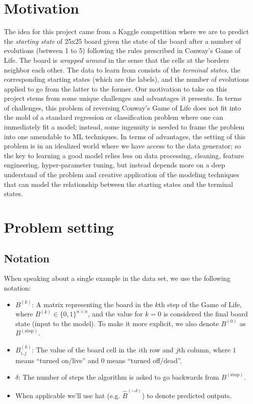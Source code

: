 \documentclass[conference]{IEEEtran}
\begin{document}
\section{Motivation}
The idea for this project came from a Kaggle competition \cite{b1} where we are to predict the {\it starting state} of 25x25 board given the state of the board after a number of evolutions (between 1 to 5) following the rules prescribed in Conway's Game of Life. The board is \emph{wrapped around} in the sense that the cells at the borders neighbor each other. The data to learn from consists of the {\it terminal states}, the corresponding starting states (which are the labels), and the number of evolutions applied to go from the latter to the former. Our motivation to take on this project stems from some unique challenges and advantages it presents. In terms of challenges, this problem of reversing Conway's Game of Life does not fit into the mold of a standard regression or classification problem where one can immediately fit a model; instead, some ingenuity is needed to frame the problem into one amendable to ML techniques. In terms of advantages, the setting of this problem is in an idealized world where we have access to the data generator; so the key to learning a good model relies less on data processing, cleaning, feature engineering, hyper-parameter tuning, but instead depends more on a deep understand of the problem and creative application of the modeling techniques that can model the relationship between the starting states and the terminal states. 

\section{Problem setting}

\subsection{Notation}
When speaking about a single example in the data set, we use the following notation:

\begin{itemize}
    \item $B^{(k)}$: A matrix representing the board in the $k$th step of the Game of Life, where  $B^{(k)} \in \{0,1\}^{n \times n}$, and the value for $k=0$ is considered the final board state (input to the model). To make it more explicit, we also denote $B^{(0)}$ as $B^{(\text{stop})}$.
    \item $B_{i,j}^{(k)}$: The value of the board cell in the $i$th row and $j$th column, where $1$ means ``turned on/live'' and $0$ means ``turned off/dead''.
    \item $\delta$: The number of steps the algorithm is asked to go backwards from $B^{(\text{stop})}$.
    \item When applicable we'll use hat (e.g. $\hat B^{(-\delta)}$) to denote predicted outputs.
\end{itemize}
\end{document}
